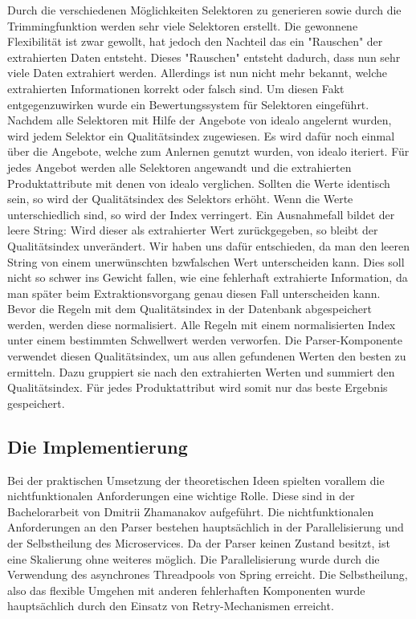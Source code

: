 Durch die verschiedenen Möglichkeiten Selektoren zu generieren sowie durch die Trimmingfunktion werden sehr viele
Selektoren erstellt.
Die gewonnene Flexibilität ist zwar gewollt, hat jedoch den Nachteil das ein "Rauschen" der extrahierten Daten entsteht.
Dieses "Rauschen" entsteht dadurch, dass nun sehr viele Daten extrahiert werden.
Allerdings ist nun nicht mehr bekannt, welche extrahierten Informationen korrekt oder falsch sind.
Um diesen Fakt entgegenzuwirken wurde ein Bewertungssystem für Selektoren eingeführt.
Nachdem alle Selektoren mit Hilfe der Angebote von idealo angelernt wurden, wird jedem Selektor ein Qualitätsindex
zugewiesen.
Es wird dafür noch einmal über die Angebote, welche zum Anlernen genutzt wurden, von idealo iteriert.
Für jedes Angebot werden alle Selektoren angewandt und die extrahierten Produktattribute mit denen von idealo
verglichen.
Sollten die Werte identisch sein, so wird der Qualitätsindex des Selektors erhöht.
Wenn die Werte unterschiedlich sind, so wird der Index verringert.
Ein Ausnahmefall bildet der leere String: Wird dieser als extrahierter Wert zurückgegeben, so bleibt der
Qualitätsindex unverändert.
Wir haben uns dafür entschieden, da man den leeren String von einem unerwünschten bzw\. falschen Wert unterscheiden
kann.
Dies soll nicht so schwer ins Gewicht fallen, wie eine fehlerhaft extrahierte Information, da man später beim
Extraktionsvorgang genau diesen Fall unterscheiden kann.
Bevor die Regeln mit dem Qualitätsindex in der Datenbank abgespeichert werden, werden diese normalisiert.
Alle Regeln mit einem normalisierten Index unter einem bestimmten Schwellwert werden verworfen.
Die Parser-Komponente verwendet diesen Qualitätsindex, um aus allen gefundenen Werten den besten zu ermitteln.
Dazu gruppiert sie nach den extrahierten Werten und summiert den Qualitätsindex.
Für jedes Produktattribut wird somit nur das beste Ergebnis gespeichert.

\subsection{Die Implementierung}
\label{subsec:implementierung}

Bei der praktischen Umsetzung der theoretischen Ideen spielten vorallem die nichtfunktionalen Anforderungen eine
wichtige Rolle.
Diese sind in der Bachelorarbeit von Dmitrii Zhamanakov aufgeführt.
Die nichtfunktionalen Anforderungen an den Parser bestehen hauptsächlich in der Parallelisierung und der
Selbstheilung des Microservices.
Da der Parser keinen Zustand besitzt, ist eine Skalierung ohne weiteres möglich.
Die Parallelisierung wurde durch die Verwendung des asynchrones Threadpools von Spring erreicht.
Die Selbstheilung, also das flexible Umgehen mit anderen fehlerhaften Komponenten wurde hauptsächlich durch den
Einsatz von Retry-Mechanismen erreicht.

